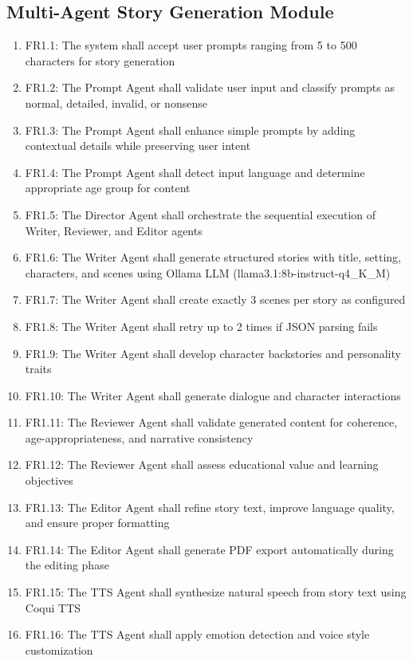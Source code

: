 \subsection{Multi-Agent Story Generation Module}
\begin{enumerate}
    \item FR1.1: The system shall accept user prompts ranging from 5 to 500 characters for story generation
    \item FR1.2: The Prompt Agent shall validate user input and classify prompts as normal, detailed, invalid, or nonsense
    \item FR1.3: The Prompt Agent shall enhance simple prompts by adding contextual details while preserving user intent
    \item FR1.4: The Prompt Agent shall detect input language and determine appropriate age group for content
    \item FR1.5: The Director Agent shall orchestrate the sequential execution of Writer, Reviewer, and Editor agents
    \item FR1.6: The Writer Agent shall generate structured stories with title, setting, characters, and scenes using Ollama LLM (llama3.1:8b-instruct-q4\_K\_M)
    \item FR1.7: The Writer Agent shall create exactly 3 scenes per story as configured
    \item FR1.8: The Writer Agent shall retry up to 2 times if JSON parsing fails
    \item FR1.9: The Writer Agent shall develop character backstories and personality traits
    \item FR1.10: The Writer Agent shall generate dialogue and character interactions
    \item FR1.11: The Reviewer Agent shall validate generated content for coherence, age-appropriateness, and narrative consistency
    \item FR1.12: The Reviewer Agent shall assess educational value and learning objectives
    \item FR1.13: The Editor Agent shall refine story text, improve language quality, and ensure proper formatting
    \item FR1.14: The Editor Agent shall generate PDF export automatically during the editing phase
    \item FR1.15: The TTS Agent shall synthesize natural speech from story text using Coqui TTS
    \item FR1.16: The TTS Agent shall apply emotion detection and voice style customization

\end{enumerate}
